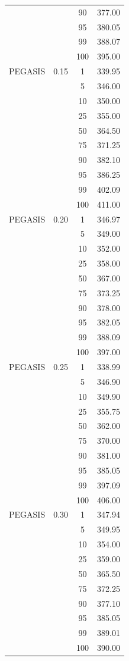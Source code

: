 \documentclass[a4paper,12pt,twoside,openany]{report}
\begin{document}
\begin{longtable}{*{4}{c}}
	&	& 90	& 377.00 \\*
	&	& 95	& 380.05 \\*
	&	& 99	& 388.07 \\*
	&	& 100	& 395.00 \\*
\midrule
PEGASIS	& 0.15	& 1	& 339.95 \\*
	&	& 5	& 346.00 \\*
	&	& 10	& 350.00 \\*
	&	& 25	& 355.00 \\*
	&	& 50	& 364.50 \\*
	&	& 75	& 371.25 \\*
	&	& 90	& 382.10 \\*
	&	& 95	& 386.25 \\*
	&	& 99	& 402.09 \\*
	&	& 100	& 411.00 \\*
\midrule
PEGASIS	& 0.20	& 1	& 346.97 \\*
	&	& 5	& 349.00 \\*
	&	& 10	& 352.00 \\*
	&	& 25	& 358.00 \\*
	&	& 50	& 367.00 \\*
	&	& 75	& 373.25 \\*
	&	& 90	& 378.00 \\*
	&	& 95	& 382.05 \\*
	&	& 99	& 388.09 \\*
	&	& 100	& 397.00 \\*
\midrule
PEGASIS	& 0.25	& 1	& 338.99 \\*
	&	& 5	& 346.90 \\*
	&	& 10	& 349.90 \\*
	&	& 25	& 355.75 \\*
	&	& 50	& 362.00 \\*
	&	& 75	& 370.00 \\*
	&	& 90	& 381.00 \\*
	&	& 95	& 385.05 \\*
	&	& 99	& 397.09 \\*
	&	& 100	& 406.00 \\*
\midrule
PEGASIS	& 0.30	& 1	& 347.94 \\*
	&	& 5	& 349.95 \\*
	&	& 10	& 354.00 \\*
	&	& 25	& 359.00 \\*
	&	& 50	& 365.50 \\*
	&	& 75	& 372.25 \\*
	&	& 90	& 377.10 \\*
	&	& 95	& 385.05 \\*
	&	& 99	& 389.01 \\*
	&	& 100	& 390.00 \\*
\bottomrule
\end{longtable}
\end{document}
